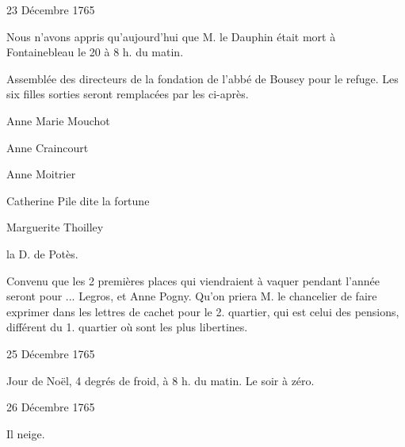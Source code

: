                      \begin{diary}{23 Décembre 1765}{}

                         Nous n'avons appris qu'aujourd'hui que M.
                              le Dauphin était mort à Fontainebleau
                           le
                              20 à 8 h. du matin. \bigskip


                         Assemblée des directeurs de la fondation
                           de l'abbé de Bousey pour le
                              refuge.
                           Les six filles sorties seront remplacées
                           par les ci-après.


                                 Anne Marie Mouchot


                                 Anne Craincourt


                                 Anne Moitrier


                                 Catherine Pile dite la
                                    fortune


                                 Marguerite Thoilley


                                 la D. de
                                    Potès.


                           Convenu que les 2 premières places
                           qui viendraient à vaquer pendant l'année
                           seront pour ... Legros, et
                              Anne Pogny.
                           Qu'on priera M. le chancelier de faire exprimer
                           dans les lettres de cachet pour le 2.
                           quartier, qui est celui des pensions, différent
                           du 1. quartier où sont les plus libertines.
                        \bigskip


                     \end{diary}

                     \begin{diary}{25 Décembre 1765}{}

                         Jour de Noël, 4 degrés de froid, à 8 h. du matin.
                           Le
                              soir
                           à zéro. \bigskip


                     \end{diary}

                     \begin{diary}{26 Décembre 1765}{}

                         Il neige. \bigskip


                     \end{diary}

